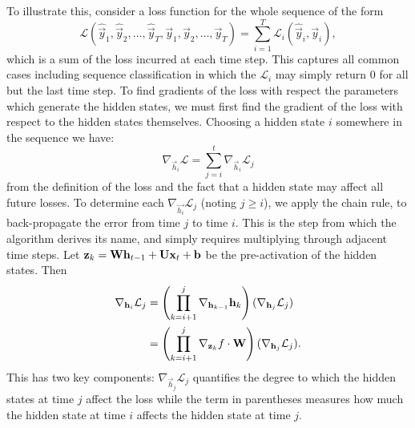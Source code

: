 To illustrate this, consider a loss function for the whole sequence of
the form
\begin{equation}
	\mathcal{L}(\hat{\vec{y}}_1, \hat{\vec{y}}_2, \dots, \hat{\vec{y}}_T,
				\vec{y}_1, \vec{y}_2, \dots, \vec{y}_T)
	= \sum_{i=1}^T \mathcal{L}_i(\hat{\vec{y}}_i, \vec{y}_i),
	\label{eq:seqloss}
\end{equation} which is a sum of the loss incurred at each time step. This captures all common
cases including sequence classification in which the \(\mathcal{L}_i\) may simply return
\(0\) for all but the last time step. To find gradients of the loss with respect the parameters
which generate the hidden states, we must first find the gradient of the loss with respect to the
hidden states themselves. Choosing a hidden state \(i\) somewhere in the sequence we have:
\begin{equation}
	\nabla_{\vec{h}_i}\mathcal{L} = \sum_{j=i}^t \nabla_{\vec{h}_i}\mathcal{L}_j
	\label{eq:delhL}
\end{equation} from the definition of the loss and the fact that a hidden state may affect all
future losses. To determine each \(\nabla_{\vec{h_i}}\mathcal{L}_j\) (noting \(j \geq i\)), we
apply the chain rule, to back-propagate the error from time \(j\) to time \(i\). This is the step
from which the algorithm derives its name, and simply requires multiplying through adjacent
time steps. Let \(\mathbf{z}_k = \mathbf{W}\mathbf{h}_{t-1} + \mathbf{U}\mathbf{x}_t +  \mathbf{b}\) be the
pre-activation of the hidden states. Then
\begin{align}
	\nabla_{\mathbf{h}_i} \mathcal{L}_j &= 
	\left(\prod_{k=i+1}^j \nabla_{\mathbf{h}_{k-1}} \mathbf{h}_k\right)
	(\nabla_{\mathbf{h}_j}\mathcal{L}_j) \\
	&=  \left(\prod_{k=i+1}^j \nabla_{\mathbf{z}_k}f \cdot \mathbf{W}\right)
	(\nabla_{\mathbf{h}_j}\mathcal{L}_j).
	\label{eq:bptt-v}
\end{align} This has two key components: \(\nabla_{\vec{h}_j}\mathcal{L}_j\) quantifies the degree
to which the hidden states at time \(j\) affect the loss while the term in parentheses
measures how much the hidden state at time \(i\) affects the hidden
state at time \(j\).

